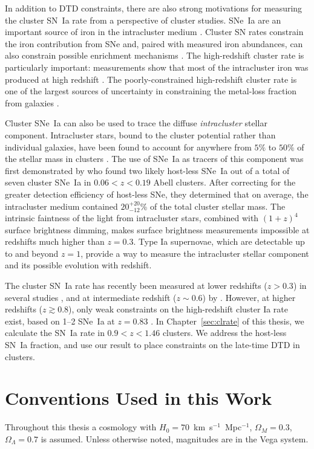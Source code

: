 In addition to DTD constraints, there are also strong motivations for
measuring the cluster SN~Ia rate from a perspective of cluster
studies. SNe~Ia are an important source of iron in the intracluster
medium \citep[e.g.,][]{loewenstein06a}. Cluster SN rates constrain the
iron contribution from SNe and, paired with measured iron abundances,
can also constrain possible enrichment mechanisms \citep{maoz04a}. The
high-redshift cluster rate is particularly important: measurements
show that most of the intracluster iron was produced at high
redshift \citep{calura07a}. The poorly-constrained high-redshift
cluster rate is one of the largest sources of uncertainty in
constraining the metal-loss fraction from galaxies \citep{sivanandam09a}.

Cluster SNe~Ia can also be used to trace the
diffuse \emph{intracluster} stellar component. Intracluster stars,
bound to the cluster potential rather than individual galaxies, have
been found to account for anywhere from $5\%$ to $50\%$ of the stellar
mass in clusters \citep[e.g.,][]{ferguson98a,feldmeier98a,
gonzalez00a,feldmeier04a,lin04a,zibetti05a,gonzalez05a,krick06a,mihos05a}.
The use of SNe~Ia as tracers of this component was first demonstrated
by \citet{galyam03a} who found two likely host-less SNe~Ia out of a
total of seven cluster SNe~Ia in $0.06 < z < 0.19$ Abell
clusters. After correcting for the greater detection efficiency of host-less
SNe, they determined that on average, the intracluster medium
contained $20^{+20}_{-12}$\% of the total cluster stellar mass.  The
intrinsic faintness of the light from intracluster stars, combined
with $(1+z)^4$ surface brightness dimming, makes surface brightness
measurements impossible at redshifts much higher than $z=0.3$.  Type
Ia supernovae, which are detectable up to and beyond $z=1$, provide a
way to measure the intracluster stellar component and its possible
evolution with redshift.

The cluster SN~Ia rate has recently been measured at lower redshifts
($z>0.3$) in several studies \citep{sharon07a,mannucci08a,dilday10b},
and at intermediate redshift ($z\sim 0.6$) by
\citet{sharon10a}. However, at higher redshifts ($z \gtrsim 0.8$),
only weak constraints on the high-redshift cluster Ia rate exist,
based on 1--2 SNe~Ia at $z=0.83$ \citep{galyam02a}.  In
Chapter~\ref{sec:clrate} of this thesis, we calculate the SN~Ia rate
in $0.9 < z < 1.46$ clusters. We address the host-less SN~Ia fraction,
and use our result to place constraints on the late-time DTD in
clusters.

\section{Conventions Used in this Work}

Throughout this thesis a cosmology with
$H_0=70$~km~s$^{-1}$~Mpc$^{-1}$, $\Omega_M=0.3$, $\Omega_\Lambda =
0.7$ is assumed. Unless otherwise noted, magnitudes are in the Vega
system.
